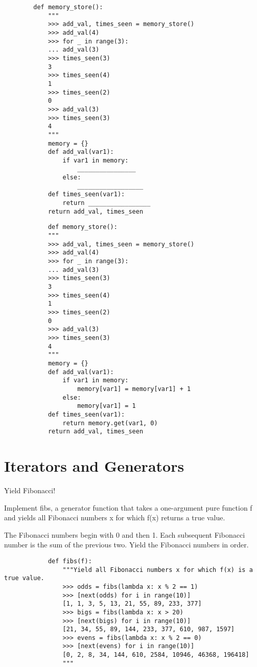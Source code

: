 \documentclass{exam}
\begin{document}
\begin{questions}
\begin{blocksection}
\begin{blocksection}
        \begin{lstlisting}
        def memory_store():
            """
            >>> add_val, times_seen = memory_store()
            >>> add_val(4)
            >>> for _ in range(3):
            ... add_val(3)
            >>> times_seen(3)
            3
            >>> times_seen(4)
            1
            >>> times_seen(2)
            0
            >>> add_val(3)
            >>> times_seen(3)
            4
            """
            memory = {}
            def add_val(var1):
                if var1 in memory:
                    ________________
                else:
                    __________________
            def times_seen(var1):
                return _________________
            return add_val, times_seen
        \end{lstlisting}
    \end{blocksection}
    \begin{solution}
        \begin{lstlisting}
            def memory_store():
            """
            >>> add_val, times_seen = memory_store()
            >>> add_val(4)
            >>> for _ in range(3):
            ... add_val(3)
            >>> times_seen(3)
            3
            >>> times_seen(4)
            1
            >>> times_seen(2)
            0
            >>> add_val(3)
            >>> times_seen(3)
            4
            """
            memory = {}
            def add_val(var1):
                if var1 in memory:
                    memory[var1] = memory[var1] + 1
                else:
                    memory[var1] = 1
            def times_seen(var1):
                return memory.get(var1, 0)
            return add_val, times_seen
        \end{lstlisting}
    \end{solution}
\section{Iterators and Generators}
	\question Yield Fibonacci!
	\begin{blocksection}
		Implement fibs, a generator function that takes a one-argument pure function f and yields all Fibonacci numbers x for which f(x) returns a true value.
		
		The Fibonacci numbers begin with 0 and then 1. Each subsequent Fibonacci number is the sum of the previous two. Yield the Fibonacci numbers in order.
		\begin{lstlisting}
			def fibs(f):
				"""Yield all Fibonacci numbers x for which f(x) is a true value.
				>>> odds = fibs(lambda x: x % 2 == 1)
				>>> [next(odds) for i in range(10)]
				[1, 1, 3, 5, 13, 21, 55, 89, 233, 377]
				>>> bigs = fibs(lambda x: x > 20)
				>>> [next(bigs) for i in range(10)]
				[21, 34, 55, 89, 144, 233, 377, 610, 987, 1597]
				>>> evens = fibs(lambda x: x % 2 == 0)
				>>> [next(evens) for i in range(10)]
				[0, 2, 8, 34, 144, 610, 2584, 10946, 46368, 196418]
				"""
				

\end{lstlisting}
\end{blocksection}
\end{blocksection}
\end{questions}
\end{document}
